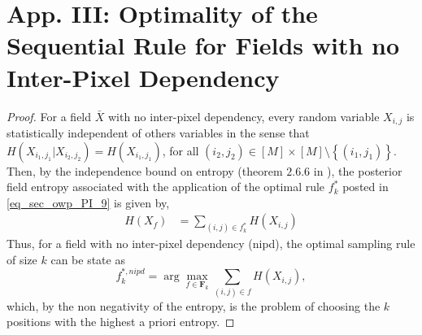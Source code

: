 \section{App. III: Optimality of the Sequential Rule  for Fields with no Inter-Pixel Dependency}
\label{optinality_no_iterpixel_PI}
\begin{proof}
For a field $\bar{X}$ with no inter-pixel dependency, every random variable $X_{i,j}$ is statistically independent of others variables in the sense that $H(X_{i_{1},j_{1}} | X_{i_{2},j_{2}}) = H(X_{i_{1},j_{1}}) $, for all $(i_{2},j_{2})\in [M]\times [M]  \setminus \left\{(i_{1},j_{1})\right\} $. Then, by the independence bound on entropy (theorem $2.6.6$ in \citep{cover_2006}), the posterior field entropy associated with the application of the optimal rule $f^{*}_{k}$ posted in \eqref{eq_sec_owp_PI_9} is given by,
\begin{align}\label{eq_proofB_1_PI}
	H({X}_f) &= \sum_{(i,j) \in {f^{*}_{k}} } H(X_{i,j})
\end{align}
Thus, for a field with no inter-pixel dependency (nipd), the optimal sampling rule of size $k$ can be state as
\begin{equation}\label{eq_proofB_2_PI}
	f^{*,nipd}_k = \arg \max_{f\in \mathbf{F}_k} 	 \sum_{(i,j) \in {f} } H(X_{i,j}), 
\end{equation}
which, by the non negativity of the entropy, is the problem of choosing the $k$ positions with the highest a priori entropy.  


\end{proof}
